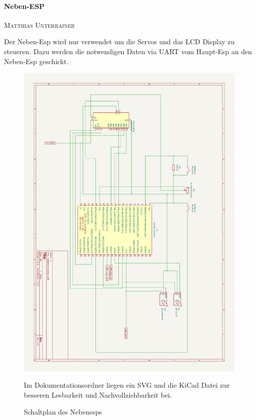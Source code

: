 \documentclass[12pt,a4paper,bibliography=totocnumbered,listof=totocnumbered]{article}
\makeatletter
\newcommand{\chapterauthor}[1]{%
  {\parindent0pt\vspace*{-5pt}%
  \linespread{1.1}\small\scshape#1%
  \par\nobreak\vspace*{3pt}}
  \@afterheading%
}
\makeatother
\begin{document}
\paragraph{Neben-ESP}
\chapterauthor{Matthias Unterrainer}
Der Neben-Esp wird nur verwendet um die Servos und das LCD Display zu steueren. Dazu werden die notwendigen Daten via UART vom Haupt-Esp an den Neben-Esp geschickt.
\begin{figure}[htpb] %
    \begin{center}
        \includegraphics[width=15cm,keepaspectratio=true]{pics/circuit_nebenesp.png}
        \caption{Schaltplan des Nebenesps}
        \label{curcit_nebenesp}
    \end{center}
    Im Dokumentationsordner liegen ein SVG und die KiCad Datei zur besseren Lesbarkeit und Nachvollziehbarkeit bei.
\end{figure}
\end{document}
